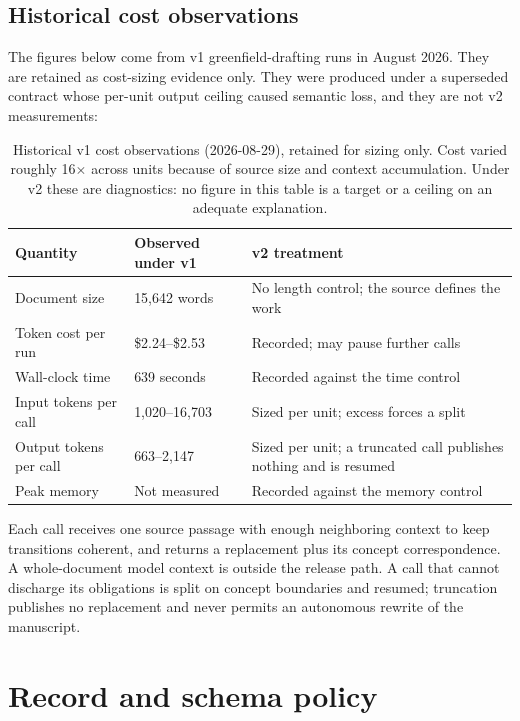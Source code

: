 \subsection{Historical cost observations}

The figures below come from v1 greenfield-drafting runs in August 2026. They are
retained as cost-sizing evidence only. They were produced under a superseded
contract whose per-unit output ceiling caused semantic loss, and they are not
v2 measurements:

\begin{table}[H]
\centering
\small
\begin{tabularx}{\textwidth}{@{}p{}p{}L@{}}
\toprule
Quantity & Observed under v1 & v2 treatment \\
\midrule
Document size & 15,642 words & No length control; the source defines the work \\
Token cost per run & \$2.24--\$2.53 & Recorded; may pause further calls \\
Wall-clock time & 639 seconds & Recorded against the time control \\
Input tokens per call & 1,020--16,703 & Sized per unit; excess forces a split \\
Output tokens per call & 663--2,147 & Sized per unit; a truncated call publishes
nothing and is resumed \\
Peak memory & Not measured & Recorded against the memory control \\
\bottomrule
\end{tabularx}
\caption{Historical v1 cost observations (2026-08-29), retained for sizing only.
Cost varied roughly 16$\times$ across units because of source size and context
accumulation. Under v2 these are diagnostics: no figure in this table is a target
or a ceiling on an adequate explanation.}
\label{tab:contract-measured-budgets}
\end{table}

Each call receives one source passage with enough neighboring context to keep
transitions coherent, and returns a replacement plus its concept correspondence.
A whole-document model context is outside the release path. A call that cannot
discharge its obligations is split on concept boundaries and resumed; truncation
publishes no replacement and never permits an autonomous rewrite of the
manuscript.

\section{Record and schema policy}
\label{sec:contract-schemas}


